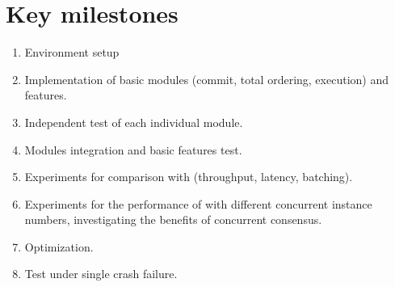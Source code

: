 
\section{Key milestones}
\begin{enumerate}
    \item Environment setup
    \item Implementation of basic modules (commit, total ordering, execution) and features.
    \item Independent test of each individual module.
    \item Modules integration and basic features test.
    \item Experiments for comparison with \PBFT{} (throughput, latency, batching).
    \item Experiments for the performance of \RCC{} with different concurrent instance numbers, investigating the benefits of concurrent consensus.
    \item Optimization.
    \item Test under single crash failure.
\end{enumerate}
